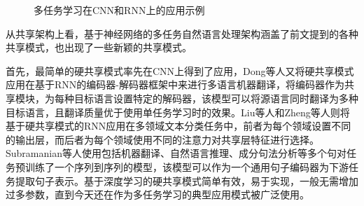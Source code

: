 \begin{figure}[htb]
	\centering
	\caption{多任务学习在CNN和RNN上的应用示例}
	\label{fig:mtl_cnn_rnn}
\end{figure}

从共享架构上看，基于神经网络的多任务自然语言处理架构涵盖了前文提到的各种共享模式，也出现了一些新颖的共享模式。

首先，最简单的硬共享模式率先在CNN上得到了应用\cite{DBLP:conf/icml/CollobertW08}，Dong等人\cite{DBLP:conf/acl/DongWHYW15}又将硬共享模式应用在基于RNN的编码器-解码器框架中来进行多语言机器翻译，将编码器作为共享模块，为每种目标语言设置特定的解码器，该模型可以将源语言同时翻译为多种目标语言，且翻译质量优于使用单任务学习时的效果。Liu等人\cite{DBLP:conf/ijcai/LiuQH16}和Zheng等人\cite{DBLP:conf/ijcai/ZhengCQ18}则将基于硬共享模式的RNN应用在多领域文本分类任务中，前者为每个领域设置不同的输出层，而后者为每个领域使用不同的注意力对共享层特征进行选择。Subramanian等人\cite{DBLP:conf/iclr/SubramanianTBP18}使用包括机器翻译、自然语言推理、成分句法分析等多个句对任务预训练了一个序列到序列的模型，该模型可以作为一个通用句子编码器为下游任务提取句子表示。基于深度学习的硬共享模式简单有效，易于实现，一般无需增加过多参数，直到今天还在作为多任务学习的典型应用模式被广泛使用\cite{liu2019multi}。

